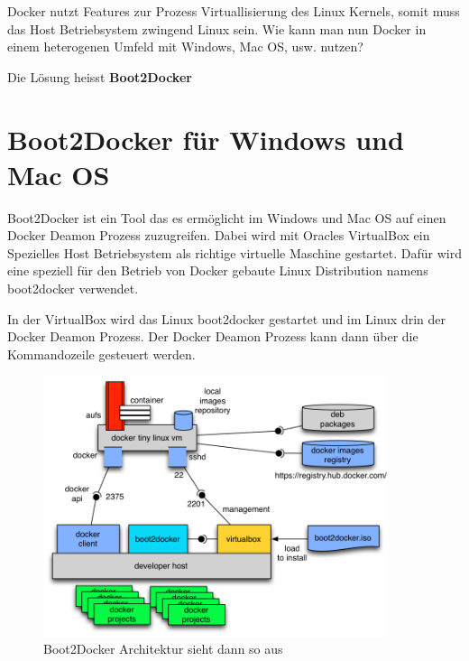 Docker nutzt Features zur Prozess Virtuallisierung des Linux Kernels, somit muss das Host
Betriebsystem zwingend Linux sein. Wie kann man nun Docker in einem heterogenen Umfeld mit
Windows, Mac OS, usw. nutzen?

Die Lösung heisst \textbf{Boot2Docker}

\section{Boot2Docker für Windows und Mac OS}

Boot2Docker ist ein Tool das es ermöglicht im Windows und Mac OS auf einen Docker Deamon
Prozess zuzugreifen. Dabei wird mit Oracles VirtualBox ein Spezielles Host Betriebsystem
als richtige virtuelle Maschine gestartet. Dafür wird eine speziell für den Betrieb von
Docker gebaute Linux Distribution namens boot2docker verwendet.

In der VirtualBox wird das Linux boot2docker gestartet und im Linux drin der Docker Deamon
Prozess. Der Docker Deamon Prozess kann dann über die Kommandozeile gesteuert werden.
\\

\begin{figure}[htbp]
  \begin{center}
    \includegraphics[width=0.9\textwidth]{./images/boot2docker.png}
    \caption{Boot2Docker Architektur sieht dann so aus}
    \label{img:boot2docker}
  \end{center}
\end{figure}
